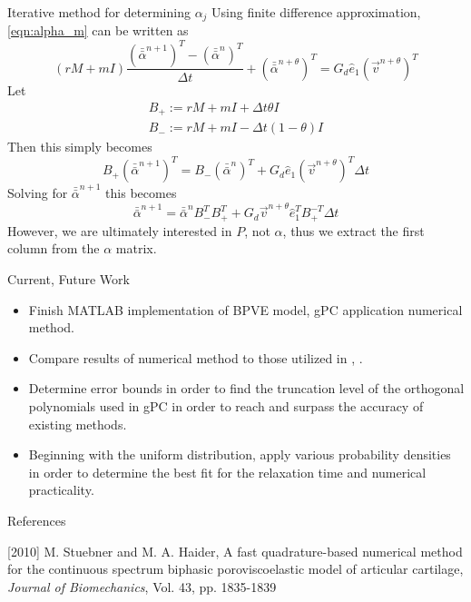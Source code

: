 \documentclass[final]{beamer} %
\newcommand{\am}{\bar{\bar{\alpha}}}
\begin{document}
\begin{frame}[t]
\begin{columns}[t]
\begin{column}{0.28\paperwidth}
\begin{block}{Iterative method for determining $\alpha_j$}
Using finite difference approximation, \ref{eqn:alpha_m} can be written as 
\begin{equation}
(rM + mI) \frac{(\am^{n+1})^T - (\am^n)^T}{\Delta t} + (\am^{n+\theta})^T =
G_d \hat{e}_1 (\vec{v}^{n+\theta})^T
\end{equation}
Let
\[ \begin{array}{c}
B_+ := rM + mI + \Delta t \theta I \\
B_- := rM + mI - \Delta t (1-\theta) I
\end{array} \]
Then this simply becomes
\begin{equation}
B_+ (\am^{n+1})^T = B_- (\am^n)^T + G_d \hat{e}_1 (\vec{v}^{n+\theta})^T \Delta t
\end{equation}
Solving for $\am^{n+1}$ this becomes
\begin{equation}
\am^{n+1} = \am^n B_-^T B_+^T + G_d \vec{v}^{n+\theta} \hat{e}_1^T B_+^{-T} \Delta t
\end{equation}
However, we are ultimately interested in $P$, not $\alpha$, thus we extract the first column from the $\alpha$ matrix.
\end{block}

\begin{block}{Current, Future Work}
\begin{itemize}
\item
Finish MATLAB implementation of BPVE model, gPC application numerical method.
\item
Compare results of numerical method to those utilized in \cite{stuebner}, \cite{schugart}.
\item
Determine error bounds in order to find the truncation level of the orthogonal
polynomials used in gPC in order to reach and surpass the accuracy of existing methods.
\item
Beginning with the uniform distribution, apply various probability densities in order
to determine the best fit for the relaxation time and numerical practicality.
\end{itemize}
\end{block}

\begin{block}{References}
\begin{thebibliography}{7}

{\small
{}[2010] M. Stuebner and M. A. Haider, A fast quadrature-based numerical method for the continuous spectrum biphasic poroviscoelastic model of articular cartilage, {\em Journal of Biomechanics}, Vol. 43, pp. 1835-1839

}
\end{thebibliography}
\end{block}
\end{column}
\end{columns}
\end{frame}
\end{document}
